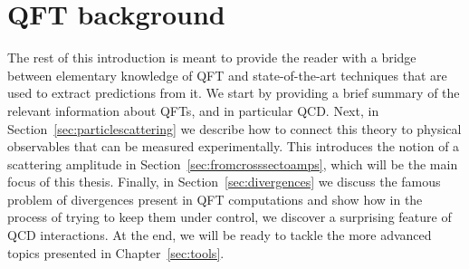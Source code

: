 \documentclass[main.tex]{subfiles}
\begin{document}
\section{QFT background} \label{sec:QFTintro}
The rest of this introduction is meant to provide the reader with a bridge between elementary knowledge of QFT and state-of-the-art techniques that are used to extract predictions from it. We start by providing a brief summary of the relevant information about QFTs, and in particular QCD. Next, in Section~\ref{sec:particlescattering} we describe how to connect this theory to physical observables that can be measured experimentally. This introduces the notion of a scattering amplitude in Section~\ref{sec:fromcrosssectoamps}, which will be the main focus of this thesis. Finally, in Section~\ref{sec:divergences} we discuss the famous problem of divergences present in QFT computations and show how in the process of trying to keep them under control, we discover a surprising feature of QCD interactions. At the end, we will be ready to tackle the more advanced topics presented in Chapter~\ref{sec:tools}.
\end{document}
